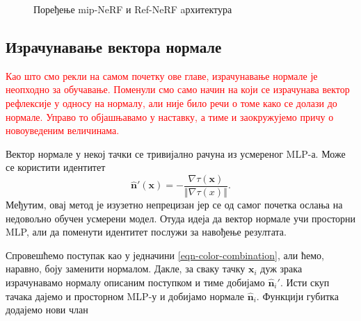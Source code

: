 \documentclass[12pt, a4paper, twoside]{book}
\numberwithin{equation}{chapter}
\numberwithin{theorem}{section}
\numberwithin{definition}{section}
\numberwithin{definitionChapter}{chapter}
\begin{document}
\begin{figure}[h]
\begin{center}
	\end{center}
	\caption{Поређење mip-NeRF и Ref-NeRF aрхитектура}
	\label{fig-refnerf-architecture}
\end{figure}

\subsection{Израчунавање вектора нормале}
\textcolor{red}{Као што смо рекли на самом почетку ове главе, израчунавање нормале је неопходно за обучавање.
Поменули смо само начин на који се израчунава вектор рефлексије у односу на нормалу, али није било
речи о томе како се долази до нормале. Управо то објашњавамо у наставку, а тиме и заокружујемо причу
о новоуведеним величинама.}

Вектор нормале у некој тачки се тривијално рачуна из усмереног MLP-а. Може се користити идентитет
	\begin{equation}
		\hat{\textbf{n}}'(\textbf{x}) = -\frac{\nabla\tau(\textbf{x})}{\left\Vert\nabla\tau(x)\right\Vert}.
	\end{equation}
Међутим, овај метод је изузетно непрецизан јер се од самог почетка ослања на недовољно обучен усмерени модел.
Отуда идеја да вектор нормале учи просторни MLP, али да поменути идентитет послужи за навођење резултата.

Спровешћемо поступак као у једначини \ref{eqn-color-combination}, али ћемо, наравно, боју заменити нормалом.
Дакле, за сваку тачку $\mathbf{x}_i$ дуж зрака израчунавамо нормалу описаним поступком и тиме добијамо $\hat{\mathbf{n}}_i'$.
Исти скуп тачака дајемо и просторном MLP-у и добијамо нормале $\hat{\mathbf{n}}_i$. Функцији губитка додајемо нови члан
\end{document}
